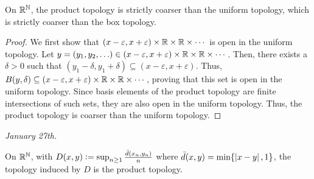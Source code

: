\begin{lemma}
    On $\mathbb{R}^{\mathbb{N}}$, the product topology is strictly coarser than the uniform topology, which is strictly coarser than the box topology.
\end{lemma}
\begin{proof}
    We first show that $(x-\varepsilon,x+\varepsilon) \times \mathbb{R} \times \mathbb{R} \times \cdots$ is open in the uniform topology. Let $y = (y_{1}, y_{2}, \ldots) \in (x-\varepsilon,x+\varepsilon) \times \mathbb{R} \times \mathbb{R} \times \cdots$. Then, there exists a $\delta > 0$ such that $(y_{1}-\delta,y_{1}+\delta) \subseteq (x-\varepsilon,x+\varepsilon)$. Thus, $B(y,\delta) \subseteq (x-\varepsilon,x+\varepsilon) \times \mathbb{R} \times \mathbb{R} \times \cdots$, proving that this set is open in the uniform topology. Since basis elements of the product topology are finite intersections of such sets, they are also open in the uniform topology. Thus, the product topology is coarser than the uniform topology.
\end{proof}

\textit{January 27th.}

\begin{theorem}
    On $\mathbb{R}^{\mathbb{N}}$, with $D(x,y) \vcentcolon= \sup_{n \geq 1} \frac{\bar{d}(x_{n},y_{n})}{n}$ where $\bar{d}(x,y) = \min\{\left| x-y \right|, 1\}$, the topology induced by $D$ is the product topology.
\end{theorem}

